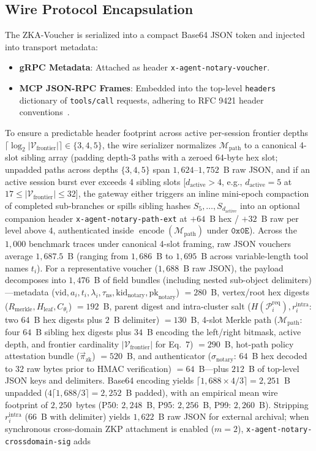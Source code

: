 \documentclass[conference,10pt]{IEEEtran}
\begin{document}
\subsection{Wire Protocol Encapsulation}
The ZKA-Voucher is serialized into a compact Base64 JSON token and injected into transport metadata:
\begin{itemize}
    \item \textbf{gRPC Metadata}: Attached as header \texttt{x-agent-notary-voucher}.
    \item \textbf{MCP JSON-RPC Frames}: Embedded into the top-level \texttt{headers} dictionary of \texttt{tools/call} requests, adhering to RFC 9421 header conventions~\cite{backman2024rfc9421}.
\end{itemize}
To ensure a predictable header footprint across active per-session frontier depths $\lceil \log_2 |\mathcal{V}_{\text{frontier}}| \rceil \in \{3, 4, 5\}$, the wire serializer normalizes $\mathcal{M}_{\text{path}}$ to a canonical 4-slot sibling array (padding depth-3 paths with a zeroed 64-byte hex slot; unpadded paths across depths $\{3, 4, 5\}$ span $1{,}624$--$1{,}752$~B raw JSON, and if an active session burst ever exceeds 4 sibling slots [$d_{\text{active}} > 4$, e.g., $d_{\text{active}} = 5$ at $17 \le |\mathcal{V}_{\text{frontier}}| \le 32$], the gateway either triggers an inline mini-epoch compaction of completed sub-branches or spills sibling hashes $S_5, \dots, S_{d_{\text{active}}}$ into an optional companion header \texttt{x-agent-notary-path-ext} at $+64$~B hex / $+32$~B raw per level above $4$, authenticated inside $\operatorname{encode}(\mathcal{M}_{\text{path}})$ under $\mathtt{0x0E}$). Across the $1{,}000$ benchmark traces under canonical 4-slot framing, raw JSON vouchers average $1{,}687.5$~B (ranging from $1{,}686$~B to $1{,}695$~B across variable-length tool names $t_i$). For a representative voucher ($1{,}688$~B raw JSON), the payload decomposes into $1{,}476$~B of field bundles (including nested sub-object delimiters)---metadata ($\text{vid}, a_i, t_i, \lambda_i, \tau_{\text{ns}}, \text{kid}_{\text{notary}}, \text{pk}_{\text{notary}}$) $= 280$~B, vertex/root hex digests ($R_{\text{merkle}}, H_{\text{leaf}}, C_{\theta_i}$) $= 192$~B, parent digest and intra-cluster salt ($H(\mathcal{P}_i^{\text{req}}), r_i^{\text{intra}}$: two $64$~B hex digests plus $2$~B delimiter) $= 130$~B, 4-slot Merkle path ($\mathcal{M}_{\text{path}}$: four $64$~B sibling hex digests plus $34$~B encoding the left/right bitmask, active depth, and frontier cardinality $|\mathcal{V}_{\text{frontier}}|$ for Eq.~7) $= 290$~B, hot-path policy attestation bundle ($\vec{\pi}_{\text{zk}}$) $= 520$~B, and authenticator ($\sigma_{\text{notary}}$: $64$~B hex decoded to $32$ raw bytes prior to HMAC verification) $= 64$~B---plus $212$~B of top-level JSON keys and delimiters. Base64 encoding yields $\lceil 1{,}688 \times 4 / 3 \rceil = 2{,}251$~B unpadded ($4\lceil 1{,}688 / 3 \rceil = 2{,}252$~B padded), with an empirical mean wire footprint of $2{,}250$~bytes (P50: $2{,}248$~B, P95: $2{,}256$~B, P99: $2{,}260$~B). Stripping $r_i^{\text{intra}}$ ($66$~B with delimiter) yields $1{,}622$~B raw JSON for external archival; when synchronous cross-domain ZKP attachment is enabled ($m=2$), \texttt{x-agent-notary-crossdomain-sig} adds 
\end{document}
